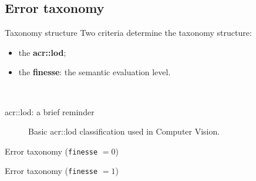 \documentclass[10pt, export]{beamer}
\begin{document}
            \subsection{Error taxonomy}
            \begin{frame}{Taxonomy structure}
                Two criteria determine the taxonomy structure:
                \begin{itemize}[label=$\blacktriangleright$, font=\color{IGNGreen}, itemsep=2em]
                    \item<2-> the \textbf{\acrfull{acr::lod}};
                    \item<3-> the \textbf{finesse}: the semantic evaluation level.
                \end{itemize}
                ~\\
            \end{frame}
            \begin{frame}{\acrshort{acr::lod}: a brief reminder}
                \begin{figure}
                    \begin{center}
                        
                    \end{center}
                    \caption{Basic \acrshort{acr::lod} classification used in Computer Vision.}
                \end{figure}
            \end{frame}    
            \begin{frame}{Error taxonomy (\texttt{finesse} $= 0$)}
                \begin{figure}
                    
                \end{figure}
            \end{frame}
            \begin{frame}{Error taxonomy (\texttt{finesse} $= 1$)}
                \begin{figure}
                    
                \end{figure}
            \end{frame}
\end{document}
